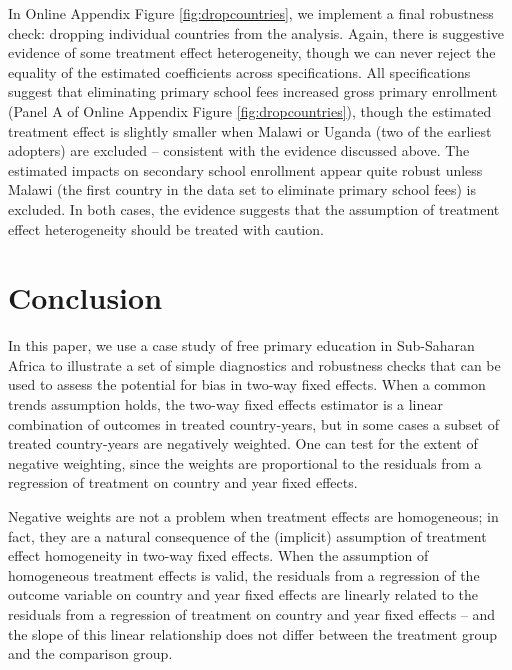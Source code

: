 \documentclass[11pt]{article}
\begin{document}
In Online Appendix Figure \ref{fig:dropcountries}, we implement a final robustness check:  dropping individual countries from the analysis.  Again, there is suggestive evidence of some treatment effect heterogeneity, though we can never reject the equality of the estimated coefficients across specifications.  All specifications suggest that eliminating primary school fees increased gross primary enrollment (Panel A of Online Appendix Figure \ref{fig:dropcountries}), though the estimated treatment effect is slightly smaller when Malawi or Uganda (two of the earliest adopters) are excluded -- consistent with the evidence discussed above.  The estimated impacts on secondary school enrollment appear quite robust unless Malawi (the first country in the data set to eliminate primary school fees) is excluded.  In both cases, the evidence suggests that the assumption of treatment effect heterogeneity should be treated with caution.  

\section{Conclusion}

In this paper, we use a case study of free primary education in Sub-Saharan Africa to illustrate a set of simple diagnostics and robustness checks 
that can be used to assess the potential for bias in two-way fixed effects.  When a common trends assumption holds, the two-way fixed effects estimator is a linear combination of outcomes in treated country-years, but in some cases a subset of treated country-years are negatively weighted.  One can test for the extent of negative weighting, since the weights are proportional to the residuals from a regression of treatment on country and year fixed effects.  

Negative weights are not a problem when treatment effects are homogeneous; in fact, they are a natural consequence of the (implicit) assumption of treatment effect homogeneity in two-way fixed effects.  When the assumption of homogeneous treatment effects is valid, the residuals from a regression of the outcome variable on country and year fixed effects are linearly related to the residuals from a regression of treatment on country and year fixed effects -- and the slope of this linear relationship does not differ between the treatment group and the comparison group.  
\end{document}
